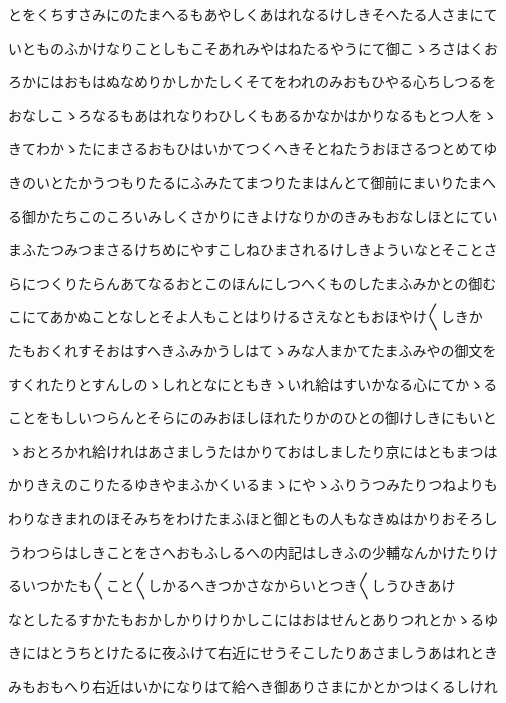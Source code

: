 \documentclass[a4paper,11pt,landscape]{ltjtarticle}
\begin{document}
\par\medskip
とをくちすさみにのたまへるもあやしくあはれなるけしきそへたる人さまにて
\par\medskip
いとものふかけなりことしもこそあれみやはねたるやうにて御こゝろさはくお
\par\medskip
ろかにはおもはぬなめりかしかたしくそてをわれのみおもひやる心ちしつるを
\par\medskip
おなしこゝろなるもあはれなりわひしくもあるかなかはかりなるもとつ人をゝ
\par\medskip
きてわかゝたにまさるおもひはいかてつくへきそとねたうおほさるつとめてゆ
\par\medskip
きのいとたかうつもりたるにふみたてまつりたまはんとて御前にまいりたまへ
\par\medskip
る御かたちこのころいみしくさかりにきよけなりかのきみもおなしほとにてい
\par\medskip
まふたつみつまさるけちめにやすこしねひまされるけしきよういなとそことさ
\par\medskip
らにつくりたらんあてなるおとこのほんにしつへくものしたまふみかとの御む
\par\medskip
こにてあかぬことなしとそよ人もことはりけるさえなともおほやけ〱しきか
\par\medskip
たもおくれすそおはすへきふみかうしはてゝみな人まかてたまふみやの御文を
\par\medskip
すくれたりとすんしのゝしれとなにともきゝいれ給はすいかなる心にてかゝる
\par\medskip
ことをもしいつらんとそらにのみおほしほれたりかのひとの御けしきにもいと
\par\medskip
ゝおとろかれ給けれはあさましうたはかりておはしましたり京にはともまつは
\par\medskip
かりきえのこりたるゆきやまふかくいるまゝにやゝふりうつみたりつねよりも
\par\medskip
わりなきまれのほそみちをわけたまふほと御ともの人もなきぬはかりおそろし
\par\medskip
うわつらはしきことをさへおもふしるへの内記はしきふの少輔なんかけたりけ
\par\medskip
るいつかたも〱こと〱しかるへきつかさなからいとつき〱しうひきあけ
\par\medskip
なとしたるすかたもおかしかりけりかしこにはおはせんとありつれとかゝるゆ
\par\medskip
きにはとうちとけたるに夜ふけて右近にせうそこしたりあさましうあはれとき
\par\medskip
みもおもへり右近はいかになりはて給へき御ありさまにかとかつはくるしけれ
\par\medskip
\end{document}
